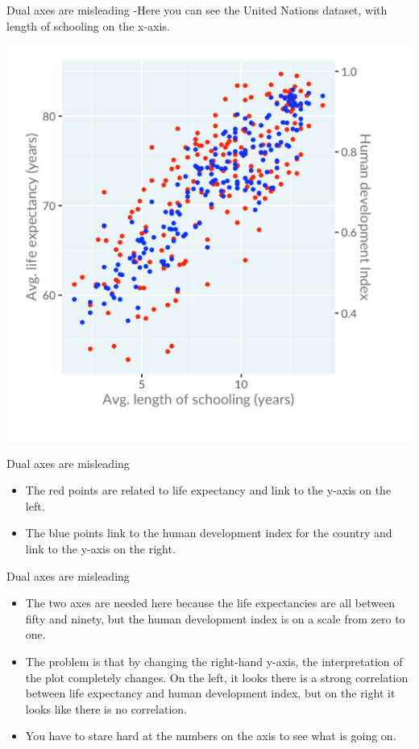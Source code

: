 \documentclass[
  ignorenonframetext,
]{beamer}
\begin{document}
\begin{frame}{Dual axes are misleading}
\label{dual-axes-are-misleading-2}
-Here you can see the United Nations dataset, with length of schooling
on the x-axis.

\includegraphics{../images/im109.png}
\end{frame}

\begin{frame}{Dual axes are misleading}
\label{dual-axes-are-misleading-3}
\begin{itemize}
\item
  The red points are related to life expectancy and link to the y-axis
  on the left.
\item
  The blue points link to the human development index for the country
  and link to the y-axis on the right.
\end{itemize}
\end{frame}

\begin{frame}{Dual axes are misleading}
\label{dual-axes-are-misleading-4}
\begin{itemize}
\item
  The two axes are needed here because the life expectancies are all
  between fifty and ninety, but the human development index is on a
  scale from zero to one.
\item
  The problem is that by changing the right-hand y-axis, the
  interpretation of the plot completely changes. On the left, it looks
  there is a strong correlation between life expectancy and human
  development index, but on the right it looks like there is no
  correlation.
\item
  You have to stare hard at the numbers on the axis to see what is going
  on.
\end{itemize}
\end{frame}
\end{document}
